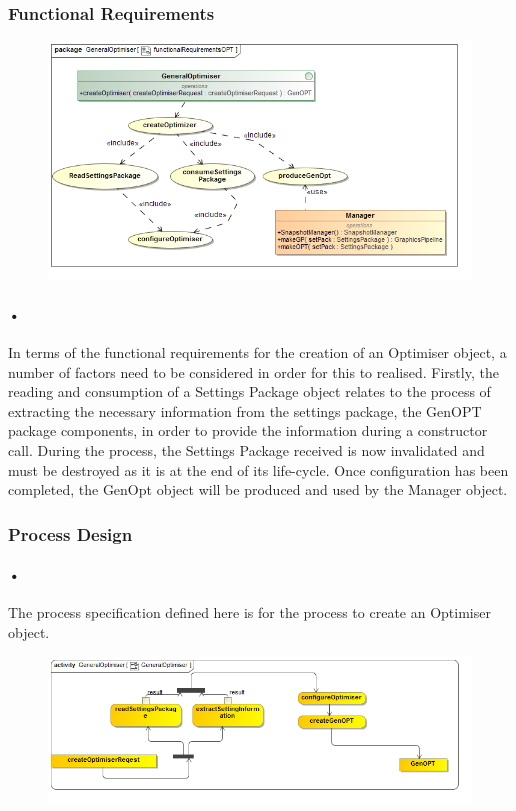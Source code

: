 \documentclass[11pt]{article}
\begin{document}
\subsubsection{Functional Requirements}
\begin{figure}[H]
\includegraphics[scale=0.5]{functionalRequirementsOPT.png}
\end{figure}

\paragraph{•}
In terms of the functional requirements for the creation of an Optimiser object, a number of factors need to be considered in order for this to realised. Firstly, the reading and consumption of a Settings Package object relates to the process of extracting the necessary information from the settings package, the GenOPT package components, in order to provide the information during a constructor call. During the process, the Settings Package received is now invalidated and must be destroyed as it is at the end of its life-cycle. Once configuration has been completed, the GenOpt object will be produced and used by the Manager object.
\subsubsection{Process Design}
\paragraph{•}
The process specification defined here is for the process to create an Optimiser object.
\begin{figure}[H]
\includegraphics[scale=0.5]{GeneralOptimiserActivity.png}
\end{figure}
\end{document}
